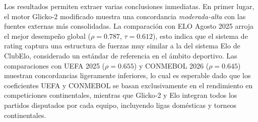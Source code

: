 \begin{table}[htbp]
	\centering
	\caption{Validaciones contra rankings institucionales (Lite).}
	\label{tab:validaciones_lite}
\end{table}

Los resultados permiten extraer varias conclusiones inmediatas. En primer lugar, el motor Glicko‑2 modificado muestra una concordancia \emph{moderada-alta} con las fuentes externas m\'as consolidadas. La comparaci\'on con ELO Agosto 2025 arroja el mejor desempe\~no global ($\rho = 0.787$, $\tau = 0.612$), esto indica que el sistema de rating captura una estructura de fuerzas muy similar a la del sistema Elo de ClubElo, considerado un est\'andar de referencia en el \'ambito deportivo. Las comparaciones con UEFA 2025 ($\rho = 0.655$) y CONMEBOL 2026 ($\rho = 0.645$) muestran concordancias ligeramente inferiores, lo cual es esperable dado que los coeficientes UEFA y CONMEBOL se basan exclusivamente en el rendimiento en competiciones continentales, mientras que Glicko‑2 y Elo integran todos los partidos disputados por cada equipo, incluyendo ligas dom\'esticas y torneos continentales.

